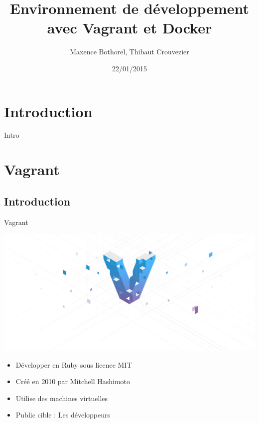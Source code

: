 \documentclass{beamer}
\title{Environnement de développement avec Vagrant et Docker}
\author{Maxence Bothorel, Thibaut Crouvezier}
\institute{Licence professionnelle ASRALL,\\
    IUT Nancy Charlemagne,\\
    Nancy}
\date{22/01/2015}
\begin{document}
    \begin{frame}
        \maketitle{}
    \end{frame}
    	
    \section{Introduction}
    	
    \begin{frame}
        Intro
    \end{frame}
    
    \section{Vagrant}
    \subsection{Introduction}
    
    \begin{frame}{Vagrant}
        \begin{center}
            \includegraphics[scale=0.1]{images_rapport/vagrant_logo.jpg}
        \end{center}
        \begin{itemize}
            \item{Développer en Ruby sous licence MIT}
            \item{Créé en 2010 par Mitchell Hashimoto}
            \pause{}
            \item{Utilise des machines virtuelles}
            \item{Public cible : Les développeurs}
        \end{itemize}
    \end{frame}
\end{document}
